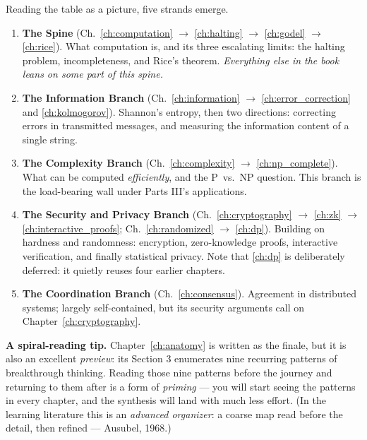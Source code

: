 Reading the table as a picture, five strands emerge. 

\begin{enumerate}
\item \textbf{The Spine} (Ch.~\ref{ch:computation} $\to$ \ref{ch:halting} $\to$ \ref{ch:godel} $\to$ \ref{ch:rice}). What computation is, and its three escalating limits: the halting problem, incompleteness, and Rice's theorem. \emph{Everything else in the book leans on some part of this spine.}
\item \textbf{The Information Branch} (Ch.~\ref{ch:information} $\to$ \ref{ch:error_correction} and \ref{ch:kolmogorov}). Shannon's entropy, then two directions: correcting errors in transmitted messages, and measuring the information content of a single string.
\item \textbf{The Complexity Branch} (Ch.~\ref{ch:complexity} $\to$ \ref{ch:np_complete}). What can be computed \emph{efficiently}, and the P~vs.\ NP question. This branch is the load-bearing wall under Parts III's applications.
\item \textbf{The Security and Privacy Branch} (Ch.~\ref{ch:cryptography} $\to$ \ref{ch:zk} $\to$ \ref{ch:interactive_proofs}; Ch.~\ref{ch:randomized} $\to$ \ref{ch:dp}). Building on hardness and randomness: encryption, zero-knowledge proofs, interactive verification, and finally statistical privacy. Note that \ref{ch:dp} is deliberately deferred: it quietly reuses four earlier chapters.
\item \textbf{The Coordination Branch} (Ch.~\ref{ch:consensus}). Agreement in distributed systems; largely self-contained, but its security arguments call on Chapter~\ref{ch:cryptography}.
\end{enumerate}

\textbf{A spiral-reading tip.} Chapter~\ref{ch:anatomy} is written as the finale, but it is also an excellent \emph{preview}: its Section 3 enumerates nine recurring patterns of breakthrough thinking. Reading those nine patterns before the journey and returning to them after is a form of \emph{priming} --- you will start seeing the patterns in every chapter, and the synthesis will land with much less effort. (In the learning literature this is an \emph{advanced organizer}: a coarse map read before the detail, then refined --- Ausubel, 1968.) 

